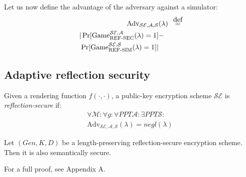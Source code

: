 Let us now define the advantage of the adversary against a simulator:
\begin{align*}
    \text{Adv}_{\mathcal{SE}, \mathcal{A}, \mathcal{S}}&(\lambda) &\defeq\\
    |\Pr[\text{Game}_{\text{REF-SEC}}^{\mathcal{SE},\mathcal{A}}(\lambda) = 1] &-\\
    \Pr[\text{Game}_{\text{REF-SIM}}^{\mathcal{SE},\mathcal{S}}(\lambda) = 1]| &
\end{align*}

\subsection{Adaptive reflection security}\label{subsec:adaptiverefsec}

Given a rendering function $f(\cdot, \cdot)$, a public-key encryption
scheme $\mathcal{SE}$ is \textit{reflection-secure} if:
\begin{align*}
    \forall \mathcal{M}:
    \forall g:
    \forall PPT \mathcal{A}:
    \exists PPT \mathcal{S}:\\
    \text{Adv}_{\mathcal{SE}, \mathcal{A}, \mathcal{S}}(\lambda) = negl(\lambda)
\end{align*}

\begin{lemma}
    Let $(Gen, K, D)$ be a length-preserving reflection-secure encryption
    scheme. Then it is also semantically secure.
\end{lemma}

For a full proof, see Appendix A.
